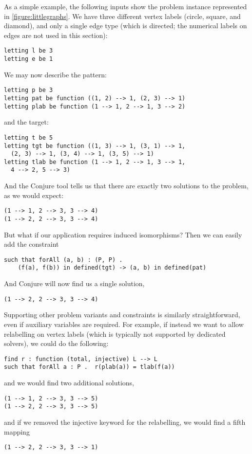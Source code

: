 \documentclass[runningheads]{llncs}
\begin{document}
As a simple example, the following inputs show the problem instance represented in
\cref{figure:littlegraphs}. We have three different vertex labels (circle, square, and diamond), and
only a single edge type (which is directed; the numerical labels on edges are not used in this
section):
\begin{lstlisting}
letting l be 3
letting e be 1
\end{lstlisting}
We may now describe the pattern:
\begin{lstlisting}
letting p be 3
letting pat be function ((1, 2) --> 1, (2, 3) --> 1)
letting plab be function (1 --> 1, 2 --> 1, 3 --> 2)
\end{lstlisting}
and the target:
\begin{lstlisting}
letting t be 5
letting tgt be function ((1, 3) --> 1, (3, 1) --> 1,
  (2, 3) --> 1, (3, 4) --> 1, (3, 5) --> 1)
letting tlab be function (1 --> 1, 2 --> 1, 3 --> 1,
  4 --> 2, 5 --> 3)
\end{lstlisting}
And the Conjure tool tells us that there are exactly two solutions to the problem, as we would
expect:
\begin{lstlisting}
(1 --> 1, 2 --> 3, 3 --> 4)
(1 --> 2, 2 --> 3, 3 --> 4)
\end{lstlisting}
But what if our application requires induced isomorphisms? Then we can easily add the constraint
\begin{lstlisting}
such that forAll (a, b) : (P, P) .
    (f(a), f(b)) in defined(tgt) -> (a, b) in defined(pat)
\end{lstlisting}
And Conjure will now find us a single solution,
\begin{lstlisting}
(1 --> 2, 2 --> 3, 3 --> 4)
\end{lstlisting}
Supporting other problem variants and constraints is similarly straightforward, even if auxiliary
variables are required. For example, if instead we want to allow relabelling on vertex labels (which
is typically not supported by dedicated solvers), we could do the following:
\begin{lstlisting}
find r : function (total, injective) L --> L
such that forAll a : P .  r(plab(a)) = tlab(f(a))
\end{lstlisting}
and we would find two additional solutions,
\begin{lstlisting}
(1 --> 1, 2 --> 3, 3 --> 5)
(1 --> 2, 2 --> 3, 3 --> 5)
\end{lstlisting}
and if we removed the injective keyword for the relabelling, we would find a fifth mapping
\begin{lstlisting}
(1 --> 2, 2 --> 3, 3 --> 1)
\end{lstlisting}
\end{document}
